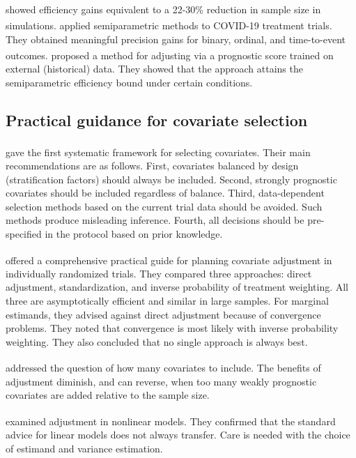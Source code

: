 \documentclass[
  11pt,
]{article}
\begin{document}
\textsuperscript{} showed efficiency gains
equivalent to a 22-30\% reduction in sample size in
simulations.\textsuperscript{} applied semiparametric
methods to COVID-19 treatment trials. They obtained
meaningful precision gains for binary, ordinal, and
time-to-event outcomes.\textsuperscript{} proposed
a method for adjusting via a prognostic score trained on
external (historical) data. They showed that the
approach attains the semiparametric efficiency bound
under certain conditions.

\subsection{Practical guidance for covariate selection}\label{practical-guidance-for-covariate-selection}

\textsuperscript{} gave the first systematic
framework for selecting covariates. Their main
recommendations are as follows. First, covariates
balanced by design (stratification factors) should
always be included. Second, strongly prognostic
covariates should be included regardless of balance.
Third, data-dependent selection methods based on the
current trial data should be avoided. Such methods
produce misleading inference. Fourth, all decisions
should be pre-specified in the protocol based on prior
knowledge.

\textsuperscript{} offered a comprehensive practical
guide for planning covariate adjustment in individually
randomized trials. They compared three approaches:
direct adjustment, standardization, and inverse
probability of treatment weighting. All three are
asymptotically efficient and similar in large samples.
For marginal estimands, they advised against direct
adjustment because of convergence problems. They noted
that convergence is most likely with inverse
probability weighting. They also concluded that no
single approach is always best.

\textsuperscript{} addressed the question of how many
covariates to include. The benefits of adjustment
diminish, and can reverse, when too many weakly
prognostic covariates are added relative to the sample
size.

\textsuperscript{} examined adjustment in nonlinear
models. They confirmed that the standard advice for
linear models does not always transfer. Care is needed
with the choice of estimand and variance estimation.
\end{document}
